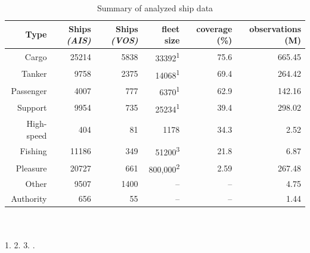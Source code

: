 


\begin{table}[htbp]
  \caption[Summary of analyzed ship data]{Summary of analyzed ship data}
  \begin{tabular}{rrrrrr} %
    \hline
    \small{Type} & \small{Ships \textit{(AIS)}} & \small{Ships \textit{(VOS)}} & \small{fleet size} & \small{coverage} (\%) & \small{observations} (M) \\
    \hline
    Cargo & 25214 & 5838 & 33392\textsuperscript{1} & 75.6 & 665.45 \\
    Tanker & 9758 & 2375 & 14068\textsuperscript{1} & 69.4 & 264.42 \\
    Passenger & 4007 & 777 & 6370\textsuperscript{1} & 62.9 & 142.16 \\
    Support & 9954 & 735 & 25234\textsuperscript{1} & 39.4 & 298.02 \\
    High-speed & 404 & 81 & 1178 & 34.3 & 2.52 \\
    Fishing & 11186 & 349 & 51200\textsuperscript{3} & 21.8 & 6.87 \\
    Pleasure & 20727 & 661 & 800,000\textsuperscript{2} & 2.59 & 267.48 \\
    Other & 9507 & 1400 & -- & -- & 4.75 \\
    Authority & 656 & 55 & -- & -- & 1.44 \\
  \end{tabular}
\\
\\
  1. \cite{Equasis2011} 2. \cite{westwood2001global} 3. \cite{FAOfishing}.
  \label{table:ships-by-type}
\end{table}


